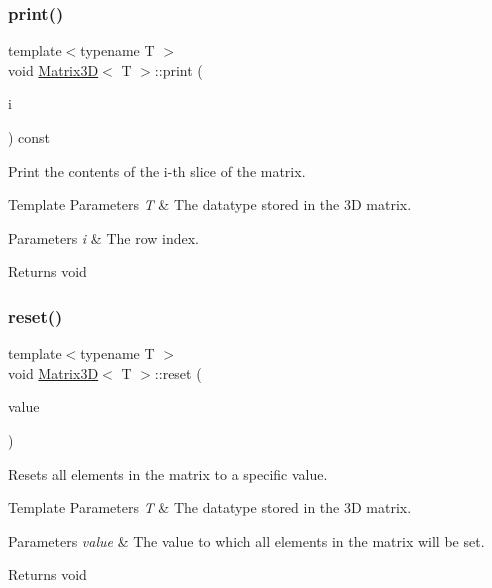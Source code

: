 \subsubsection{\texorpdfstring{print()}{print()}}
{\footnotesize\ttfamily template$<$typename T $>$ \\
void \mbox{\hyperlink{classMatrix3D}{Matrix3D}}$<$ T $>$\+::print (\begin{DoxyParamCaption}\item[{int}]{i }\end{DoxyParamCaption}) const}



Print the contents of the i-\/th slice of the matrix. 


\begin{DoxyTemplParams}{Template Parameters}
{\em T} & The datatype stored in the 3D matrix. \\
\hline
\end{DoxyTemplParams}

\begin{DoxyParams}{Parameters}
{\em i} & The row index.\\
\hline
\end{DoxyParams}
\begin{DoxyReturn}{Returns}
void 
\end{DoxyReturn}
\mbox{\label{classMatrix3D_ac67d3ee632ccafaac86dfacdda95dfdf}} 
\subsubsection{\texorpdfstring{reset()}{reset()}}
{\footnotesize\ttfamily template$<$typename T $>$ \\
void \mbox{\hyperlink{classMatrix3D}{Matrix3D}}$<$ T $>$\+::reset (\begin{DoxyParamCaption}\item[{T}]{value }\end{DoxyParamCaption})}



Resets all elements in the matrix to a specific value. 


\begin{DoxyTemplParams}{Template Parameters}
{\em T} & The datatype stored in the 3D matrix. \\
\hline
\end{DoxyTemplParams}

\begin{DoxyParams}{Parameters}
{\em value} & The value to which all elements in the matrix will be set.\\
\hline
\end{DoxyParams}
\begin{DoxyReturn}{Returns}
void 
\end{DoxyReturn}
\mbox{\label{classMatrix3D_a056c035f4997b14c2a3e2b8ebee5142c}} 
